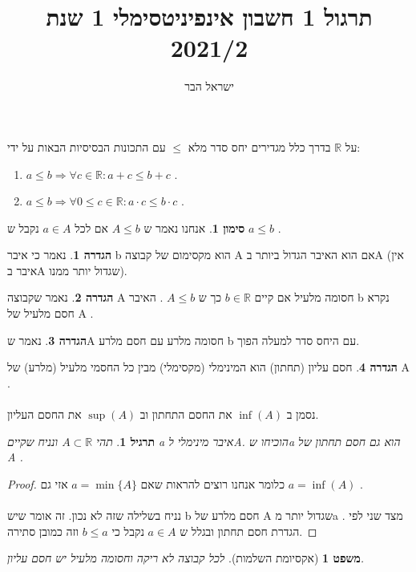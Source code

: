 \documentclass{article}
\begin{document}
\title{תרגול 1 חשבון אינפיניטסימלי 1 שנת 2021/2}
\author{ישראל הבר}
\maketitle

\newtheorem{theorem}{משפט}
\newtheorem{exercise}{תרגיל}
\newtheorem{homeexercise}{תרגיל לבית}
\newtheorem{solution}{Solution Of}
\theoremstyle{definition}
\newtheorem{definition}{הגדרה}
\newtheorem{notation}{סימון}
\newtheorem{claim}{טענה}
\renewcommand\qedsymbol{$\blacksquare$}


על 
$\mathbb{R}$
בדרך כלל מגדירים יחס סדר מלא 
$\leq$
עם התכונות הבסיסיות הבאות על ידי:


\begin{enumerate}
\item 
$a\leq b\Longrightarrow\forall c\in\mathbb{R}: a+c\leq b+c$
.

\item 
$a\leq b\Longrightarrow \forall 0\leq c\in\mathbb{R}: a\cdot c\leq b\cdot c$
.
\end{enumerate}

\begin{notation}
אנחנו נאמר ש
$A\leq b$
אם לכל 
$a\in A$
נקבל ש
$a\leq b$
.
\end{notation}

\begin{definition}
נאמר כי איבר b הוא מקסימום של קבוצה A אם הוא האיבר הגדול ביותר בA (אין איבר בA שגדול יותר ממנו).
\end{definition}

\begin{definition}
נאמר שקבוצה A חסומה מלעיל אם קיים 
$b\in\mathbb{R}$
כך ש 
$A\leq b$
.
האיבר b נקרא חסם מלעיל של A
.
\end{definition}

\begin{definition}
נאמר שA חסומה מלרע עם חסם מלרע b עם היחס סדר למעלה הפוך.
\end{definition}

\begin{definition}
חסם עליון (תחתון) הוא המינימלי (מקסימלי) מבין כל החסמי מלעיל (מלרע) של A
. 
\\ \\
נסמן ב 
$\inf(A)$
את החסם התחתון וב
$\sup(A)$
את החסם העליון.
\end{definition}

\begin{exercise}
תהי 
$A\subset \mathbb{R}$
ונניח שקיים a איבר מינימלי לA. הוכיחו שa הוא גם חסם תחתון של A
.
\end{exercise}
\begin{proof}
כלומר אנחנו רוצים להראות שאם 
$a = \min\{A\}$
אזי גם 
$a = \inf(A)$
. \\\\
נניח בשלילה שזה לא נכון. זה אומר שיש b חסם מלרע של A שגדול יותר מa
.
מצד שני לפי הגדרת חסם תחתון ובגלל ש
$a \in A$
נקבל כי 
$b\leq a$
וזה כמובן סתירה.
\end{proof}
\begin{theorem}[אקסיומת השלמות]
לכל קבוצה לא ריקה וחסומה מלעיל יש חסם עליון.
\end{theorem}
\end{document}
